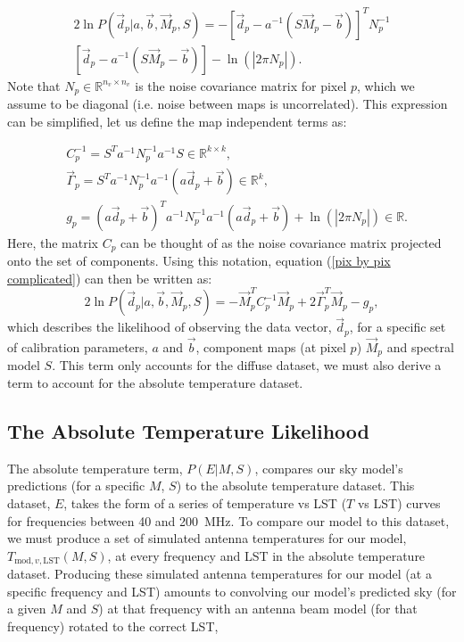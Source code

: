 \documentclass[fleqn,usenatbib]{mnras}
\begin{document}
\begin{multline}\label{pix by pix complicated}
    2\ln{P(\Vec{d}_p|a,\Vec{b},\Vec{M}_p,S)} = -\left[\Vec{d}_p - a^{-1}\left(S\Vec{M}_p -\Vec{b}\right)\right]^T N_p^{-1}\\ \left[\Vec{d}_p - a^{-1}\left(S\Vec{M}_p -\Vec{b}\right)\right] - \ln\left(\left|2\pi N_p \right|\right).
\end{multline}
Note that $N_p\in \mathbb{R}^{n_v\times n_v}$ is the noise covariance matrix for pixel $p$, which we assume to be diagonal (i.e. noise between maps is uncorrelated). This expression can be simplified, let us define the map independent terms as:

\begin{equation}
\label{notation definition}
\begin{aligned}
    &C_p^{-1} = S^T a^{-1}N_p^{-1}a^{-1} S \in \mathbb{R}^{k\times k},\\
    &\Vec{\Gamma}_p = S^T a^{-1}N_p^{-1}a^{-1} \left(a \Vec{d}_p +\Vec{b} \right) \in \mathbb{R}^{k}, \\
    &g_p = (a\Vec{d}_p + \Vec{b})^T a^{-1}N_p^{-1}a^{-1} (a\Vec{d}_p + \Vec{b}) + \ln{\left(\left|2\pi  N_p \right|\right)} \in \mathbb{R}.
\end{aligned}
\end{equation}
Here, the matrix $C_p$ can be thought of as the noise covariance matrix projected onto the set of components. Using this notation, equation (\ref{pix by pix complicated}) can then be written as:
\begin{equation}
\label{single pix diffuse term}
    2\ln{P\left(\Vec{d}_p|a,\Vec{b},\Vec{M}_p,S\right)} = -\Vec{M}_p^T C_p^{-1} \Vec{M}_p + 2\Vec{\Gamma}_p^T\Vec{M}_p - g_p,
\end{equation}
which describes the likelihood of observing the data vector, $\Vec{d}_p$, for a specific set of calibration parameters, $a$ and $\Vec{b}$, component maps (at pixel $p$) $\Vec{M}_p$ and spectral model $S$. This term only accounts for the diffuse dataset, we must also derive a term to account for the absolute temperature dataset.


\subsection{The Absolute Temperature Likelihood}
The absolute temperature term, $P(E|M,S)$, compares our sky model's predictions (for a specific $M$, $S$) to the absolute temperature dataset. This dataset, $E$, takes the form of a series of temperature vs LST ($T$ vs LST) curves for frequencies between 40 and 200~MHz. To compare our model to this dataset, we must produce a set of simulated antenna temperatures for our model, $T_{\mathrm{mod},v,\mathrm{LST}}(M,S)$, at every frequency and LST in the absolute temperature dataset. Producing these simulated antenna temperatures for our model (at a specific frequency and LST) amounts to convolving our model's predicted sky (for a given $M$ and $S$) at that frequency with an antenna beam model (for that frequency) rotated to the correct LST, 
\end{document}
